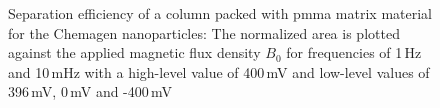 \begin{figure}
\centering
{}
\caption[Separation efficiency of a column packed with \gls{pmma} matrix material]{Separation efficiency of a column packed with \gls{pmma} matrix material for the Chemagen nanoparticles: The normalized area is plotted against the applied magnetic flux density $B_{0}$ for frequencies of 1\,Hz and 10\,mHz with a high-level value of 400\,mV and low-level values of 396\,mV, 0\,mV and -400\,mV
\label{fig:norm_area_PMMA}
}
\end{figure}


